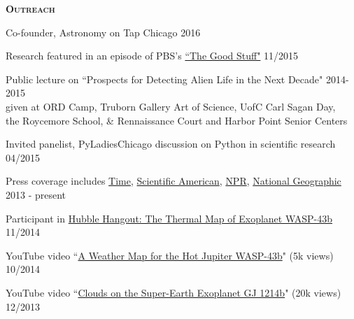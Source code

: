 \documentclass[12pt,letterpaper]{article}
\begin{document}
\textbf{\textsc{Outreach}} 
\begin{compactitem}[]
\item Co-founder, Astronomy on Tap Chicago \hfill 2016
\item Research featured in an episode of PBS's \href{https://www.youtube.com/watch?v=i4Hrmh6LJ0Q&index=2&list=PLsRLUurFnvvXTEbTjA1tvHhWmh6aKTgDw}{``The Good Stuff"} \hfill 11/2015
\item Public lecture on ``Prospects for Detecting Alien Life in the Next Decade" \hfill 2014-2015 \\
\hspace*{5 mm}given at ORD Camp, Truborn Gallery Art of Science, UofC Carl Sagan Day,\\ 
\hspace*{5 mm}the Roycemore School, \& Rennaissance Court and Harbor Point Senior Centers
\item Invited panelist, PyLadiesChicago discussion on Python in scientific research \hfill 04/2015
\item Press coverage includes \href{http://science.time.com/2013/12/31/the-real-space-oddities-super-earths-and-jumbo-neptunes/}{Time}, \href{http://www.nature.com/scientificamerican/journal/v23/n3s/full/scientificamericanuniverse0814-4.html}{Scientific American}, \href{http://www.npr.org/2014/01/02/259222620/on-planet-gj1214-b-expect-exotic-cloud-cover}{NPR}, \href{http://news.nationalgeographic.com/news/2014/10/141014-space-hubble-planet-weather-science/?utm_source=Twitter&utm_medium=Social&utm_content=link_tw20141014news-hubbletele&utm_campaign=Content&sf5218387=1}{National Geographic} \hfill 2013 - present
\item Participant in \href{https://www.youtube.com/watch?v=n-oDqYCf3XY}{Hubble Hangout: The Thermal Map of Exoplanet WASP-43b} \hfill 11/2014
\item YouTube video ``\href{https://www.youtube.com/watch?v=tQZqAVhUk9E}{A Weather Map for the Hot Jupiter WASP-43b}" (5k views) \hfill 10/2014
\item YouTube video ``\href{https://www.youtube.com/watch?v=8x2DcgZiKTA}{Clouds on the Super-Earth Exoplanet GJ 1214b}" (20k views) \hfill 12/2013

\end{compactitem}
\end{document}
